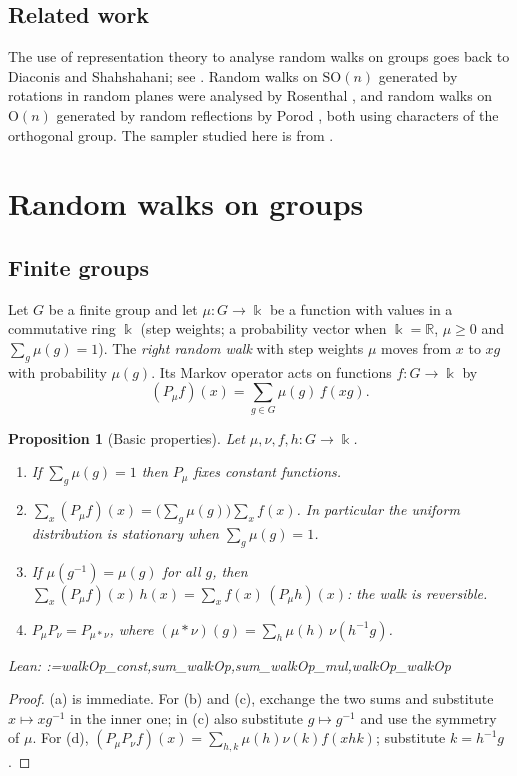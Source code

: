 \documentclass[11pt]{amsart}
\makeatletter
\newtheorem{proposition}[theorem]{Proposition}
\theoremstyle{definition}
\theoremstyle{remark}
\newcommand{\@leanlist}[1]{\def\@leansep{}\@for\@leanname:=#1\do{\@leansep
  \texttt{\expandafter\detokenize\expandafter{\@leanname}}\def\@leansep{, }}}
\newcommand{\lean}[1]{\par\smallskip\noindent
  {\footnotesize\normalfont\raggedright\textsf{Lean:} \@leanlist{#1}\par}}
\newcommand{\R}{\mathbb{R}}
\newcommand{\SO}{\mathrm{SO}}
\newcommand{\Or}{\mathrm{O}}
\makeatother
\begin{document}
\subsection{Related work}
The use of representation theory to analyse random walks on groups goes back to Diaconis and
Shahshahani; see \cite{Diaconis}.  Random walks on $\SO(n)$ generated by rotations in random
planes were analysed by Rosenthal \cite{Rosenthal}, and random walks on $\Or(n)$ generated by
random reflections by Porod \cite{Porod}, both using characters of the orthogonal group.  The
sampler studied here is from \cite{ZHG}.

\section{Random walks on groups}\label{sec:walks}

\subsection{Finite groups}
Let $G$ be a finite group and let $\mu\colon G\to\Bbbk$ be a function with values in a
commutative ring $\Bbbk$ (step weights; a probability vector when $\Bbbk=\R$, $\mu\ge0$ and
$\sum_g\mu(g)=1$).  The \emph{right random walk} with step weights $\mu$ moves from $x$ to $xg$
with probability $\mu(g)$.  Its Markov operator acts on functions $f\colon G\to\Bbbk$ by
\[
  (P_\mu f)(x)=\sum_{g\in G}\mu(g)\,f(xg).
\]

\begin{proposition}[Basic properties]\label{prop:finite-basic}
Let $\mu,\nu,f,h\colon G\to\Bbbk$.
\begin{enumerate}
\item[(a)] If $\sum_g\mu(g)=1$ then $P_\mu$ fixes constant functions.
\item[(b)] $\sum_x(P_\mu f)(x)=\bigl(\sum_g\mu(g)\bigr)\sum_xf(x)$.  In particular the uniform
distribution is stationary when $\sum_g\mu(g)=1$.
\item[(c)] If $\mu(g^{-1})=\mu(g)$ for all $g$, then
$\sum_x(P_\mu f)(x)\,h(x)=\sum_xf(x)\,(P_\mu h)(x)$: the walk is reversible.
\item[(d)] $P_\mu P_\nu=P_{\mu*\nu}$, where $(\mu*\nu)(g)=\sum_h\mu(h)\,\nu(h^{-1}g)$.
\end{enumerate}
\lean{walkOp_const,sum_walkOp,sum_walkOp_mul,walkOp_walkOp}
\end{proposition}

\begin{proof}
(a) is immediate.  For (b) and (c), exchange the two sums and substitute $x\mapsto xg^{-1}$ in
the inner one; in (c) also substitute $g\mapsto g^{-1}$ and use the symmetry of $\mu$.  For (d),
$(P_\mu P_\nu f)(x)=\sum_{h,k}\mu(h)\nu(k)f(xhk)$; substitute $k=h^{-1}g$.
\end{proof}
\end{document}
